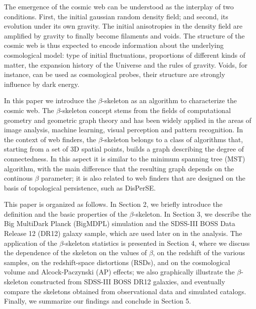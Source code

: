 \documentclass[useAMS,usenatbib]{mnras}
\begin{document}
The emergence of the cosmic web can be understood as the interplay of
two conditions. First, the initial gaussian random density field; and
second, its evolution under its own gravity. 
The initial anisotropies in the density field are amplified by gravity
to finally become filaments and voids.  
The structure of the cosmic web is thus expected to encode information
about the underlying cosmological model: type of initial fluctuations,
proportions of different kinds of matter, the expansion history of the
Universe and the rules of gravity.
Voids, for instance, can be used as cosmological probes, their
structure are strongly influence by dark energy.

In this paper we introduce the $\beta$-skeleton as an algorithm to
characterize the cosmic web.
The $\beta$-skeleton concept stems from the fields of computational geometry
and geometric graph theory and has been widely applied in the areas of
image analysis, machine learning, visual perception and pattern
recognition. 
In the context of web finders, the $\beta$-skeleton belongs to a class
of algorithms that, starting from a set of 3D spatial points, builds a
graph describing the degree of connectedness.
In this aspect it is similar to the minimum spanning tree (MST)
algorithm, with the main difference that the resulting graph depends
on the continous $\beta$ parameter;
it is also related to web finders that are designed on the basis of
topological persistence, such as DisPerSE. 





This paper is organized as follows. 
In Section 2, we briefly introduce the definition and the basic properties of the $\beta$-skeleton. 
In Section 3, we describe the Big MultiDark Planck (BigMDPL) simulation and the SDSS-III BOSS Data Release 12 (DR12) galaxy sample, which are used later on in the analysis. 
The application of the $\beta$-skeleton statistics is presented in Section 4, 
where we discuss the dependence of the skeleton on the values of $\beta$, 
on the redshift of the various samples, on the redshift-space distortions (RSDs), and on the cosmological volume and Alcock-Paczynski (AP) effects; 
we also graphically illustrate the $\beta$-skeleton constructed from SDSS-III BOSS DR12 galaxies,
and eventually compare the skeletons obtained from observational data and simulated catalogs.  
Finally, we summarize our findings and conclude in Section 5. 



 
\end{document}
